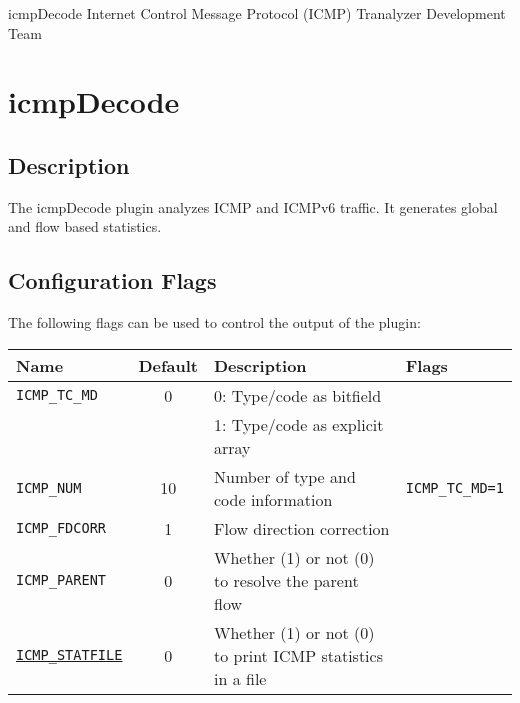 \documentclass[documentation]{subfiles}
\begin{document}
\trantitle
    {icmpDecode}
    {Internet Control Message Protocol (ICMP)}
    {Tranalyzer Development Team} %

\section{icmpDecode}\label{s:icmpDecode}

\subsection{Description}
The icmpDecode plugin analyzes ICMP and ICMPv6 traffic.
It generates global and flow based statistics.

%
%
%

\subsection{Configuration Flags}
The following flags can be used to control the output of the plugin:
\begin{longtable}{lcll}
    \toprule
    {\bf Name} & {\bf Default} & {\bf Description} & {\bf Flags}\\
    \midrule\endhead%
    {\tt ICMP\_TC\_MD}   &  0 & 0: Type/code as bitfield\\
                         &    & 1: Type/code as explicit array\\
    {\tt ICMP\_NUM}      & 10 & Number of type and code information & {\tt ICMP\_TC\_MD=1}\\
    {\tt ICMP\_FDCORR}   &  1 & Flow direction correction\\
    {\tt ICMP\_PARENT}   &  0 & Whether (1) or not (0) to resolve the parent flow\\

    {\tt \hyperref[icmpDecode:additonalOutput]{ICMP\_STATFILE}} & 0 & Whether (1) or not (0) to print ICMP statistics in a file\\
    \bottomrule
\end{longtable}
\end{document}
